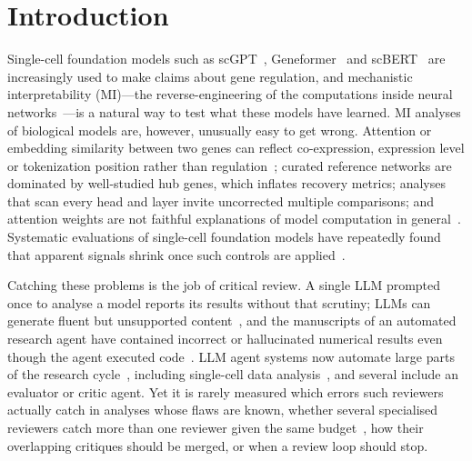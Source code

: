 \section*{Introduction}

Single-cell foundation models such as scGPT~\cite{cui2024scgpt}, Geneformer~\cite{theodoris2023transfer} and scBERT~\cite{yang2022scbert} are increasingly used to make claims about gene regulation, and mechanistic interpretability (MI)---the reverse-engineering of the computations inside neural networks~\cite{olah2020zoom,elhage2022toy,conmy2023towards}---is a natural way to test what these models have learned. MI analyses of biological models are, however, unusually easy to get wrong. Attention or embedding similarity between two genes can reflect co-expression, expression level or tokenization position rather than regulation~\cite{pratapa2020benchmarking}; curated reference networks are dominated by well-studied hub genes, which inflates recovery metrics; analyses that scan every head and layer invite uncorrected multiple comparisons; and attention weights are not faithful explanations of model computation in general~\cite{jain2019attention,wiegreffe2019attention,serrano2019attention}. Systematic evaluations of single-cell foundation models have repeatedly found that apparent signals shrink once such controls are applied~\cite{kedzierska2025zeroshot,boiarsky2023deepdive,kendiukhov2026attention}.

Catching these problems is the job of critical review. A single LLM prompted once to analyse a model reports its results without that scrutiny; LLMs can generate fluent but unsupported content~\cite{farquhar2024semantic}, and the manuscripts of an automated research agent have contained incorrect or hallucinated numerical results even though the agent executed code~\cite{beel2025evaluating}. LLM agent systems now automate large parts of the research cycle~\cite{lu2026aiscientist,schmidgall2025agentlab,gottweis2026coscientist,swanson2025virtuallab}, including single-cell data analysis~\cite{xiao2026cellagent,alber2026cellvoyager}, and several include an evaluator or critic agent. Yet it is rarely measured which errors such reviewers actually catch in analyses whose flaws are known, whether several specialised reviewers catch more than one reviewer given the same budget~\cite{wang2024rethinking,smit2024mad}, how their overlapping critiques should be merged, or when a review loop should stop.

